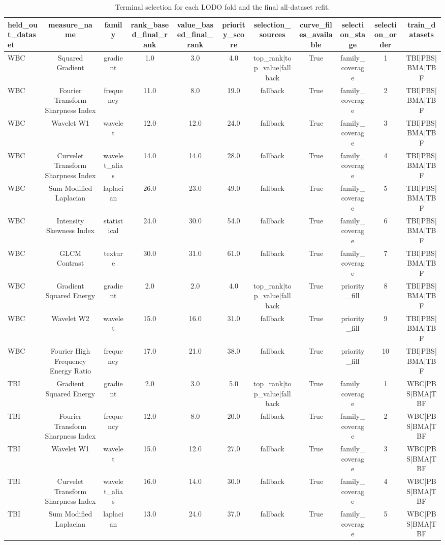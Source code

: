 \begin{table}[t]
\centering
\caption{Terminal selection for each LODO fold and the final all-dataset refit.}
\begin{tabular}{lcccccccccc}
\hline
held_out_dataset & measure_name & family & rank_based_final_rank & value_based_final_rank & priority_score & selection_sources & curve_files_available & selection_stage & selection_order & train_datasets \\
\hline
WBC & Squared Gradient & gradient & 1.0 & 3.0 & 4.0 & top\_rank|top\_value|fallback & True & family\_coverage & 1 & TBI|PBS|BMA|TBF \\
WBC & Fourier Transform Sharpness Index & frequency & 11.0 & 8.0 & 19.0 & fallback & True & family\_coverage & 2 & TBI|PBS|BMA|TBF \\
WBC & Wavelet W1 & wavelet & 12.0 & 12.0 & 24.0 & fallback & True & family\_coverage & 3 & TBI|PBS|BMA|TBF \\
WBC & Curvelet Transform Sharpness Index & wavelet\_alias & 14.0 & 14.0 & 28.0 & fallback & True & family\_coverage & 4 & TBI|PBS|BMA|TBF \\
WBC & Sum Modified Laplacian & laplacian & 26.0 & 23.0 & 49.0 & fallback & True & family\_coverage & 5 & TBI|PBS|BMA|TBF \\
WBC & Intensity Skewness Index & statistical & 24.0 & 30.0 & 54.0 & fallback & True & family\_coverage & 6 & TBI|PBS|BMA|TBF \\
WBC & GLCM Contrast & texture & 30.0 & 31.0 & 61.0 & fallback & True & family\_coverage & 7 & TBI|PBS|BMA|TBF \\
WBC & Gradient Squared Energy & gradient & 2.0 & 2.0 & 4.0 & top\_rank|top\_value|fallback & True & priority\_fill & 8 & TBI|PBS|BMA|TBF \\
WBC & Wavelet W2 & wavelet & 15.0 & 16.0 & 31.0 & fallback & True & priority\_fill & 9 & TBI|PBS|BMA|TBF \\
WBC & Fourier High Frequency Energy Ratio & frequency & 17.0 & 21.0 & 38.0 & fallback & True & priority\_fill & 10 & TBI|PBS|BMA|TBF \\
TBI & Gradient Squared Energy & gradient & 2.0 & 3.0 & 5.0 & top\_rank|top\_value|fallback & True & family\_coverage & 1 & WBC|PBS|BMA|TBF \\
TBI & Fourier Transform Sharpness Index & frequency & 12.0 & 8.0 & 20.0 & fallback & True & family\_coverage & 2 & WBC|PBS|BMA|TBF \\
TBI & Wavelet W1 & wavelet & 15.0 & 12.0 & 27.0 & fallback & True & family\_coverage & 3 & WBC|PBS|BMA|TBF \\
TBI & Curvelet Transform Sharpness Index & wavelet\_alias & 16.0 & 14.0 & 30.0 & fallback & True & family\_coverage & 4 & WBC|PBS|BMA|TBF \\
TBI & Sum Modified Laplacian & laplacian & 13.0 & 24.0 & 37.0 & fallback & True & family\_coverage & 5 & WBC|PBS|BMA|TBF \\
\hline
\end{tabular}
\end{table}